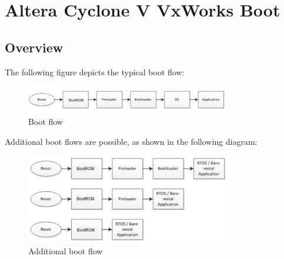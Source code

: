 \chapter{Altera Cyclone V VxWorks Boot} %

\label{ch:materialandmethods} %


\section{Overview}
\label{overview}
The following figure depicts the typical boot flow: \\
\begin{figure}[h]
	\centering		\includegraphics[width=0.8\textwidth]{img/bootschema1}
	\caption{Boot flow}
    	\label{fig:bootflow}
\end{figure}

Additional boot flows are possible, as shown in the following diagram:
\begin{figure}[h]
	\centering		\includegraphics[width=0.8\textwidth]{img/bootschema2}
	\caption{Additional boot flow}
    	\label{fig:bootflow2}
\end{figure}

